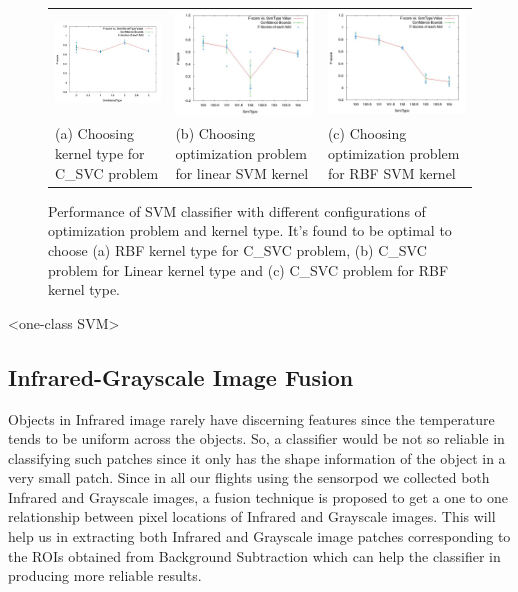 \documentclass[runningheads]{llncs}
\begin{document}
\begin{figure}
  \centering
  \begin{tabular}{m{4cm}m{4cm}m{4cm}}
    \includegraphics[width=4cm]{img/classifier/SvmKernelTypevalue_vs_score_C_SVC.jpg} &
    \includegraphics[width=4cm]{img/classifier/SvmTypevalue_vs_score_LINEAR.jpg} &
    \includegraphics[width=4cm]{img/classifier/SvmTypevalue_vs_score_RBF.jpg} \\
    \tiny (a) Choosing kernel type for C\_SVC problem & 
    \tiny (b) Choosing optimization problem for linear SVM kernel &
    \tiny (c) Choosing optimization problem for RBF SVM kernel
  \end{tabular}
  
  \caption{Performance of SVM classifier with different configurations of optimization problem and kernel type. It's found to be optimal to choose (a) RBF kernel type for C\_SVC problem, (b) C\_SVC problem for Linear kernel type and (c) C\_SVC problem for RBF kernel type.}\label{fig:k-fold}
\end{figure}


<one-class SVM>


\subsection{Infrared-Grayscale Image Fusion} 

Objects in Infrared image rarely have discerning features since the temperature tends to be uniform across the objects. So, a classifier would be not so reliable in classifying such patches since it only has the shape information of the object in a very small patch. Since in all our flights using the sensorpod we collected both Infrared and Grayscale images, a fusion technique is proposed to get a one to one relationship between pixel locations of Infrared and Grayscale images. This will help us in extracting both Infrared and Grayscale image patches corresponding to the ROIs obtained from Background Subtraction which can help the classifier in producing more reliable results.
\end{document}
